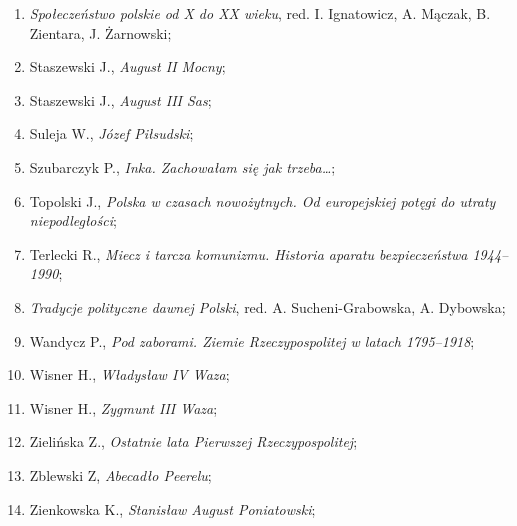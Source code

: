 \documentclass[a4paper,11pt]{article}
\begin{document}
\begin{enumerate}
\item \textit{Społeczeństwo polskie od X do XX wieku}, red. I.
  Ignatowicz, A. Mączak, B. Zientara, J. Żarnowski;



\item Staszewski J., \textit{August II Mocny};



\item Staszewski J., \textit{August III Sas};



\item Suleja W., \textit{Józef Piłsudski};



\item Szubarczyk P., \textit{Inka. Zachowałam się jak trzeba\ldots};



\item Topolski J., \textit{Polska w czasach nowożytnych. Od europejskiej
    potęgi do utraty niepodległości};



\item Terlecki R., \textit{Miecz i tarcza komunizmu. Historia aparatu
    bezpieczeństwa 1944--1990};



\item \textit{Tradycje polityczne dawnej Polski}, red. A.
  Sucheni-Grabowska, A. Dybowska;



\item Wandycz P., \textit{Pod zaborami. Ziemie Rzeczypospolitej w latach
    1795--1918};



\item Wisner H., \textit{Władysław IV Waza};



\item Wisner H., \textit{Zygmunt III Waza};



\item Zielińska Z., \textit{Ostatnie lata Pierwszej Rzeczypospolitej};



\item Zblewski Z, \textit{Abecadło Peerelu};



\item Zienkowska K., \textit{Stanisław August Poniatowski};




\end{enumerate}
\end{document}
